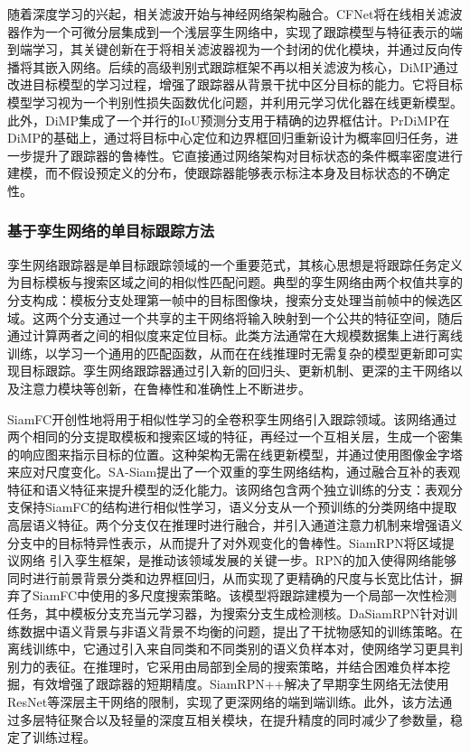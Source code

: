 随着深度学习的兴起，相关滤波开始与神经网络架构融合。CFNet\cite{Valmadre2017CFNet}将在线相关滤波器作为一个可微分层集成到一个浅层孪生网络中，实现了跟踪模型与特征表示的端到端学习，其关键创新在于将相关滤波器视为一个封闭的优化模块，并通过反向传播将其嵌入网络。后续的高级判别式跟踪框架不再以相关滤波为核心，DiMP\cite{Bhat2019DiMP}通过改进目标模型的学习过程，增强了跟踪器从背景干扰中区分目标的能力。它将目标模型学习视为一个判别性损失函数优化问题，并利用元学习优化器在线更新模型。此外，DiMP集成了一个并行的IoU预测分支用于精确的边界框估计。PrDiMP\cite{Danelljan2020PrDiMP}在DiMP的基础上，通过将目标中心定位和边界框回归重新设计为概率回归任务，进一步提升了跟踪器的鲁棒性。它直接通过网络架构对目标状态的条件概率密度进行建模，而不假设预定义的分布，使跟踪器能够表示标注本身及目标状态的不确定性。


\subsubsection{基于孪生网络的单目标跟踪方法}
孪生网络跟踪器是单目标跟踪领域的一个重要范式，其核心思想是将跟踪任务定义为目标模板与搜索区域之间的相似性匹配问题。典型的孪生网络由两个权值共享的分支构成：模板分支处理第一帧中的目标图像块，搜索分支处理当前帧中的候选区域。这两个分支通过一个共享的主干网络将输入映射到一个公共的特征空间，随后通过计算两者之间的相似度来定位目标。此类方法通常在大规模数据集上进行离线训练，以学习一个通用的匹配函数，从而在在线推理时无需复杂的模型更新即可实现目标跟踪。孪生网络跟踪器通过引入新的回归头、更新机制、更深的主干网络以及注意力模块等创新\cite{JSJX202209004}，在鲁棒性和准确性上不断进步。

SiamFC\cite{Bertinetto2016SiamFC}开创性地将用于相似性学习的全卷积孪生网络引入跟踪领域。该网络通过两个相同的分支提取模板和搜索区域的特征，再经过一个互相关层，生成一个密集的响应图来指示目标的位置。这种架构无需在线更新模型，并通过使用图像金字塔来应对尺度变化。SA-Siam\cite{He2018SASiamese}提出了一个双重的孪生网络结构，通过融合互补的表观特征和语义特征来提升模型的泛化能力。该网络包含两个独立训练的分支：表观分支保持SiamFC的结构进行相似性学习，语义分支从一个预训练的分类网络中提取高层语义特征。两个分支仅在推理时进行融合，并引入通道注意力机制来增强语义分支中的目标特异性表示，从而提升了对外观变化的鲁棒性。SiamRPN\cite{Li2018SiamRPN}将区域提议网络 引入孪生框架，是推动该领域发展的关键一步。RPN的加入使得网络能够同时进行前景背景分类和边界框回归，从而实现了更精确的尺度与长宽比估计，摒弃了SiamFC中使用的多尺度搜索策略。该模型将跟踪建模为一个局部一次性检测任务，其中模板分支充当元学习器，为搜索分支生成检测核。DaSiamRPN\cite{Zhu2018DaDASiamRPN}针对训练数据中语义背景与非语义背景不均衡的问题，提出了干扰物感知的训练策略。在离线训练中，它通过引入来自同类和不同类别的语义负样本对，使网络学习更具判别力的表征。在推理时，它采用由局部到全局的搜索策略，并结合困难负样本挖掘，有效增强了跟踪器的短期精度。SiamRPN++\cite{Li2019SiamRPN++}解决了早期孪生网络无法使用ResNet\cite{He2016ResNet}等深层主干网络的限制，实现了更深网络的端到端训练。此外，该方法通过多层特征聚合以及轻量的深度互相关模块，在提升精度的同时减少了参数量，稳定了训练过程。

